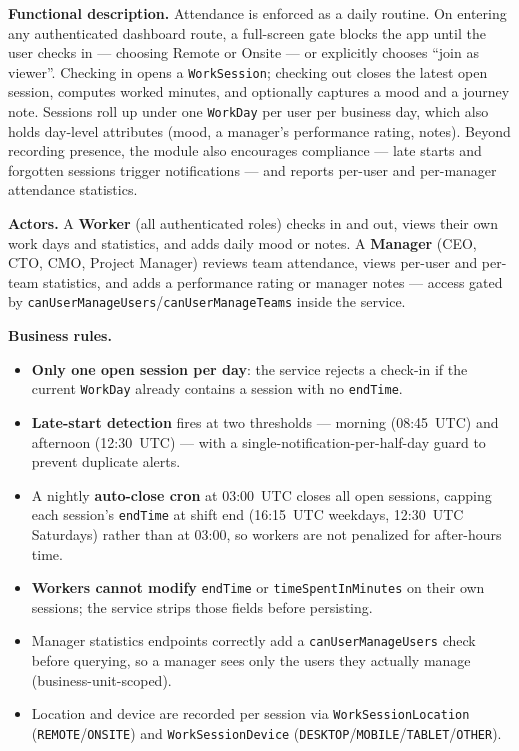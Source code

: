 \textbf{Functional description.} Attendance is enforced as a daily routine. On entering any
authenticated dashboard route, a full-screen gate blocks the app until the user checks
in --- choosing Remote or Onsite --- or explicitly chooses ``join as viewer''. Checking in opens a
\texttt{WorkSession}; checking out closes the latest open session, computes worked minutes, and
optionally captures a mood and a journey note. Sessions roll up under one \texttt{WorkDay} per
user per business day, which also holds day-level attributes (mood, a manager's performance
rating, notes). Beyond recording presence, the module also encourages compliance --- late starts
and forgotten sessions trigger notifications --- and reports per-user and per-manager attendance
statistics.

\textbf{Actors.} A \textbf{Worker} (all authenticated roles) checks in and out, views their own
work days and statistics, and adds daily mood or notes. A \textbf{Manager} (CEO, CTO, CMO,
Project Manager) reviews team attendance, views per-user and per-team statistics, and adds a
performance rating or manager notes --- access gated by
\texttt{canUserManageUsers}/\texttt{canUserManageTeams} inside the service.

\textbf{Business rules.}
\begin{itemize}
  \item \textbf{Only one open session per day}: the service rejects a check-in if the current
    \texttt{WorkDay} already contains a session with no \texttt{endTime}.
  \item \textbf{Late-start detection} fires at two thresholds --- morning (08:45~UTC) and
    afternoon (12:30~UTC) --- with a single-notification-per-half-day guard to prevent duplicate
    alerts.
  \item A nightly \textbf{auto-close cron} at 03:00~UTC closes all open sessions, capping each
    session's \texttt{endTime} at shift end (16:15~UTC weekdays, 12:30~UTC Saturdays) rather than
    at 03:00, so workers are not penalized for after-hours time.
  \item \textbf{Workers cannot modify} \texttt{endTime} or \texttt{timeSpentInMinutes} on their
    own sessions; the service strips those fields before persisting.
  \item Manager statistics endpoints correctly add a \texttt{canUserManageUsers} check before
    querying, so a manager sees only the users they actually manage (business-unit-scoped).
  \item Location and device are recorded per session via \texttt{WorkSessionLocation}
    (\texttt{REMOTE}/\texttt{ONSITE}) and \texttt{WorkSessionDevice}
    (\texttt{DESKTOP}/\texttt{MOBILE}/\texttt{TABLET}/\texttt{OTHER}).
\end{itemize}

